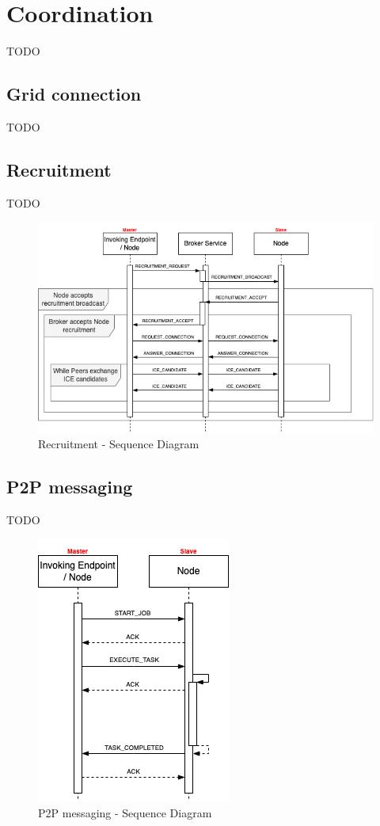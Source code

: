\section{Coordination}\label{coordination}
TODO

\subsection{Grid connection}
TODO

\subsection{Recruitment}
TODO
\begin{figure}[!ht]
    \centering
    \includegraphics[width=\linewidth]{document/chapters/chapter_7/images/recruitment_messages.png}
    \caption{Recruitment - Sequence Diagram}
    \label{fig:recruitment_messages}
\end{figure}

\subsection{P2P messaging}
TODO
\begin{figure}[!ht]
    \centering
    \includegraphics[scale=0.8]{document/chapters/chapter_7/images/p2p_messages.png}
    \caption{P2P messaging - Sequence Diagram}
    \label{fig:p2p_messages}
\end{figure}